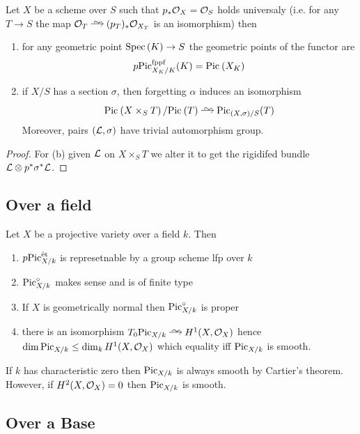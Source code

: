 \documentclass[12pt]{article}
\begin{document}
\begin{prop}
Let $X$ be a scheme over $S$ such that $p_* \mathcal{O}_{X} = \mathcal{O}_{S}$ holds universaly (i.e. for any $T \to S$ the map $\struct{T} \iso (p_T)_* \struct{X_T}$ is an isomorphism) then
\begin{enumerate}
\item for any geometric point $\mathrm{Spec}\left( K \right) \to S$ the geometric points of the functor are
\[ p \mathrm{Pic}_{X_K/K}^{\mathrm{fppf}}(K) = \mathrm{Pic}^{} \left( X_K \right) \] 
\item if $X/S$ has a section $\sigma$, then forgetting $\alpha$ induces an isomorphism
\[ \Pic{X \times_S T} / \Pic{T} \iso \fPic_{(X, \sigma)/S}(T) \]
Moreover, pairs $(\mathcal{L}, \sigma)$ have trivial automorphism group.
\end{enumerate}
\end{prop}

\begin{proof}
For (b) given $\mathcal{L}$ on $X \times_S T$ we alter it to get the rigidifed bundle $\mathcal{L} \otimes p^* \sigma^* \mathcal{L}$.
\end{proof}

\subsection{Over a field}

\begin{theorem}
Let $X$ be a projective variety over a field $k$. Then
\begin{enumerate}
\item $p\mathrm{Pic}_{X/k}^{\text{\'{e}t}}$ is represetnable by a group scheme lfp over $k$
\item $\mathrm{Pic}^\circ_{X/k}$ makes sense and is of finite type
\item If $X$ is geometrically normal then $\mathrm{Pic}_{X/k}^\circ$ is proper
\item there is an isomorphism $T_0 \fPic_{X/k} \iso H^1(X, \struct{X})$ hence $\dim{\mathrm{Pic}_{X/k}} \le \dim_k H^1(X, \mathcal{O}_{X})$ which equality iff $\mathrm{Pic}_{X/k}$ is smooth.
\end{enumerate}
\end{theorem}

\begin{rmk}
If $k$ has characteristic zero then $\mathrm{Pic}_{X/k}$ is always smooth by Cartier's theorem. However, if $H^2(X, \mathcal{O}_{X}) = 0$ then $\mathrm{Pic}_{X/k}$ is smooth.
\end{rmk}

\subsection{Over a Base}
\end{document}
